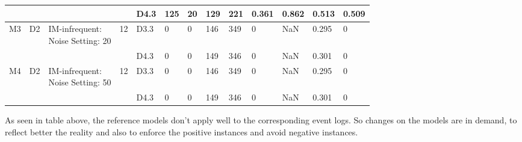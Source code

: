 \begin{table}[h]
{\begin{tabular}{|llll|lllllllll|}
		&                                                                      & &                                                                          & D4.3 & 125   &   20 & 129   &221    &    0.361    & 0.862           & 0.513          &0.509    \\
		\hline
		
		M3                                                                      & D2                                                                        & \makecell[l]{IM-infrequent: \\ Noise Setting: 20} & 12                                                                         &D3.3 &  0  & 0   & 146   & 349   & 0       &NaN           &    0.295      & 0   \\
		
		&                                                                      & &                                                                          & D4.3 &  0  & 0   & 149   & 346   & 0       & NaN           &  0.301        &0    \\
		\hline 
		
		M4                                                                      & D2                                                                        & \makecell[l]{IM-infrequent: \\ Noise Setting: 50} & 12                                                                         &D3.3 &  0  &  0  &  146  & 349   & 0       & NaN           &     0.295     & 0\\   
		&                                                                      & &                                                                          & D4.3 &  0  & 0   & 149   & 346   & 0       & NaN           &  0.301        &0    \\
		
		\hline
	\end{tabular}
 }
\end{table}
As seen in table above, the reference models don't apply well to the corresponding event logs. So changes on the models are in demand, to reflect better the reality and also to enforce the positive instances and avoid negative instances. 


